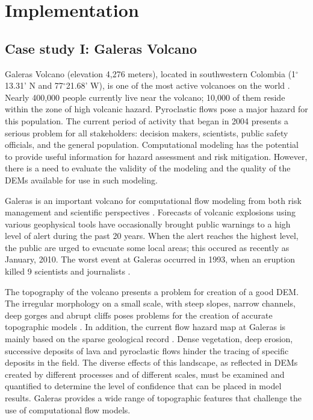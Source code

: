 \documentclass[12pt]{article}
\newcommand{\Deg}{$^{\circ}$}
\begin{document}
\section{Implementation}
\subsection{Case study I: Galeras Volcano}

Galeras Volcano (elevation 4,276 meters), located in southwestern
Colombia (1\Deg 13.31' N and 77\Deg 21.68' W), is one of the most
active volcanoes on the world \citep{hurtado_1997}. Nearly 400,000
people currently live near the volcano; 10,000 of them reside within
the zone of high volcanic hazard. Pyroclastic flows pose a major
hazard for this population. The current period of activity that began
in 2004 presents a serious problem for all stakeholders: decision
makers, scientists, public safety officials, and the general
population.  Computational modeling has the potential to provide
useful information for hazard assessment and risk mitigation.
However, there is a need to evaluate the validity of the modeling and
the quality of the DEMs available for use in such modeling.

Galeras is an important volcano for computational flow modeling from
both risk management and scientific perspectives
\citep{calvache1997}. Forecasts of volcanic explosions using various
geophysical tools \citep{narvaez_1997} have occasionally brought
public warnings to a high level of alert during the past 20
years. When the alert reaches the highest level, the public are urged
to evacuate some local areas; this occured as recently as January,
2010. The worst event at Galeras occurred in 1993, when an eruption
killed 9 scientists and journalists \citep{baxter1997}.

The topography of the volcano presents a problem for creation of a
good DEM. The irregular morphology on a small scale, with steep
slopes, narrow channels, deep gorges and abrupt cliffs poses problems
for the creation of accurate topographic models
\citep{ordones_2000}. In addition, the current flow hazard map at
Galeras is mainly based on the sparse geological record
\citep{calvache_1990a}. Dense vegetation, deep erosion, successive
deposits of lava and pyroclastic flows hinder the tracing of specific
deposits in the field. The diverse effects of this landscape, as
reflected in DEMs created by different processes and of different
scales, must be examined and quantified to determine the level of
confidence that can be placed in model results. Galeras provides a
wide range of topographic features that challenge the use of
computational flow models.
\end{document}
